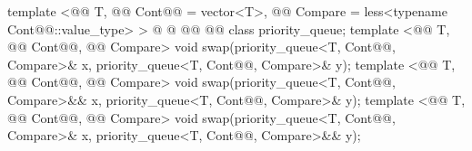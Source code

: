\documentclass[american,twoside]{book}
\begin{document}
\begin{codeblock}
{  template <@@ T, @@ Cont@@ = vector<T>,
        @@ Compare = less<typename Cont@@::value_type> >
    @ @
          @@
          @@
  class priority_queue;
  template <@@ T, @@ Cont@@, @@ Compare>
    void swap(priority_queue<T, Cont@@, Compare>& x, priority_queue<T, Cont@@, Compare>& y);
  template <@@ T, @@ Cont@@, @@ Compare>
    void swap(priority_queue<T, Cont@@, Compare>&& x, priority_queue<T, Cont@@, Compare>& y);
  template <@@ T, @@ Cont@@, @@ Compare>
    void swap(priority_queue<T, Cont@@, Compare>& x, priority_queue<T, Cont@@, Compare>&& y);
}
\end{codeblock}

%
\end{document}
